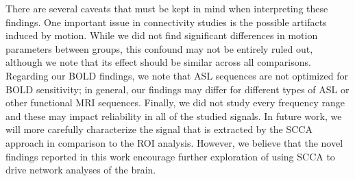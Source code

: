 \documentclass{llncs}
\begin{document}
There are several caveats that must be kept in mind when interpreting these findings.   One important issue in connectivity studies is the possible artifacts induced by motion.   While we did not find significant differences in motion parameters between groups, this confound may not be entirely ruled out, although we note that its effect should be similar across all comparisons.  Regarding our BOLD findings, we note that ASL sequences are not optimized for BOLD sensitivity; in general, our findings may differ for different types of ASL or other functional MRI sequences.  Finally, we did not study every frequency range and these may impact reliability in all of the studied signals.  In future work, we will more carefully characterize the signal that is extracted by the SCCA approach in comparison to the ROI analysis.   However, we believe that the novel findings reported in this work encourage further exploration of using SCCA to drive network analyses of the brain. 



\end{document}
